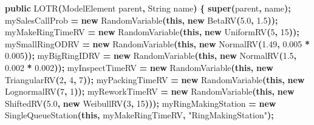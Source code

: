 \documentclass[
]{book}
\newenvironment{Shaded}{\begin{snugshade}}{\end{snugshade}}
\newcommand{\BuiltInTok}[1]{#1}
\newcommand{\DecValTok}[1]{\textcolor[rgb]{0.00,0.00,0.81}{#1}}
\newcommand{\FloatTok}[1]{\textcolor[rgb]{0.00,0.00,0.81}{#1}}
\newcommand{\FunctionTok}[1]{\textcolor[rgb]{0.00,0.00,0.00}{#1}}
\newcommand{\KeywordTok}[1]{\textcolor[rgb]{0.13,0.29,0.53}{\textbf{#1}}}
\newcommand{\NormalTok}[1]{#1}
\newcommand{\OperatorTok}[1]{\textcolor[rgb]{0.81,0.36,0.00}{\textbf{#1}}}
\newcommand{\StringTok}[1]{\textcolor[rgb]{0.31,0.60,0.02}{#1}}
\theoremstyle{definition}
\theoremstyle{definition}
\theoremstyle{definition}
\theoremstyle{definition}
\theoremstyle{remark}
\begin{document}
\begin{Shaded}
\begin{Highlighting}[]
\KeywordTok{public} \FunctionTok{LOTR}\OperatorTok{(}\NormalTok{ModelElement parent}\OperatorTok{,} \BuiltInTok{String}\NormalTok{ name}\OperatorTok{)} \OperatorTok{\{}
    \KeywordTok{super}\OperatorTok{(}\NormalTok{parent}\OperatorTok{,}\NormalTok{ name}\OperatorTok{);}
\NormalTok{    mySalesCallProb }\OperatorTok{=} \KeywordTok{new} \FunctionTok{RandomVariable}\OperatorTok{(}\KeywordTok{this}\OperatorTok{,} \KeywordTok{new} \FunctionTok{BetaRV}\OperatorTok{(}\FloatTok{5.0}\OperatorTok{,} \FloatTok{1.5}\OperatorTok{));}
\NormalTok{    myMakeRingTimeRV }\OperatorTok{=} \KeywordTok{new} \FunctionTok{RandomVariable}\OperatorTok{(}\KeywordTok{this}\OperatorTok{,} \KeywordTok{new} \FunctionTok{UniformRV}\OperatorTok{(}\DecValTok{5}\OperatorTok{,} \DecValTok{15}\OperatorTok{));}
\NormalTok{    mySmallRingODRV }\OperatorTok{=} \KeywordTok{new} \FunctionTok{RandomVariable}\OperatorTok{(}\KeywordTok{this}\OperatorTok{,} \KeywordTok{new} \FunctionTok{NormalRV}\OperatorTok{(}\FloatTok{1.49}\OperatorTok{,} \FloatTok{0.005} \OperatorTok{*} \FloatTok{0.005}\OperatorTok{));}
\NormalTok{    myBigRingIDRV }\OperatorTok{=} \KeywordTok{new} \FunctionTok{RandomVariable}\OperatorTok{(}\KeywordTok{this}\OperatorTok{,} \KeywordTok{new} \FunctionTok{NormalRV}\OperatorTok{(}\FloatTok{1.5}\OperatorTok{,} \FloatTok{0.002} \OperatorTok{*} \FloatTok{0.002}\OperatorTok{));}
\NormalTok{    myInspectTimeRV }\OperatorTok{=} \KeywordTok{new} \FunctionTok{RandomVariable}\OperatorTok{(}\KeywordTok{this}\OperatorTok{,} \KeywordTok{new} \FunctionTok{TriangularRV}\OperatorTok{(}\DecValTok{2}\OperatorTok{,} \DecValTok{4}\OperatorTok{,} \DecValTok{7}\OperatorTok{));}
\NormalTok{    myPackingTimeRV }\OperatorTok{=} \KeywordTok{new} \FunctionTok{RandomVariable}\OperatorTok{(}\KeywordTok{this}\OperatorTok{,} \KeywordTok{new} \FunctionTok{LognormalRV}\OperatorTok{(}\DecValTok{7}\OperatorTok{,} \DecValTok{1}\OperatorTok{));}
\NormalTok{    myReworkTimeRV }\OperatorTok{=} \KeywordTok{new} \FunctionTok{RandomVariable}\OperatorTok{(}\KeywordTok{this}\OperatorTok{,} \KeywordTok{new} \FunctionTok{ShiftedRV}\OperatorTok{(}\FloatTok{5.0}\OperatorTok{,} \KeywordTok{new} \FunctionTok{WeibullRV}\OperatorTok{(}\DecValTok{3}\OperatorTok{,} \DecValTok{15}\OperatorTok{)));}
\NormalTok{    myRingMakingStation }\OperatorTok{=} \KeywordTok{new} \FunctionTok{SingleQueueStation}\OperatorTok{(}\KeywordTok{this}\OperatorTok{,}\NormalTok{ myMakeRingTimeRV}\OperatorTok{,}
            \StringTok{"RingMakingStation"}\OperatorTok{);}

\end{Highlighting}
\end{Shaded}
\end{document}
